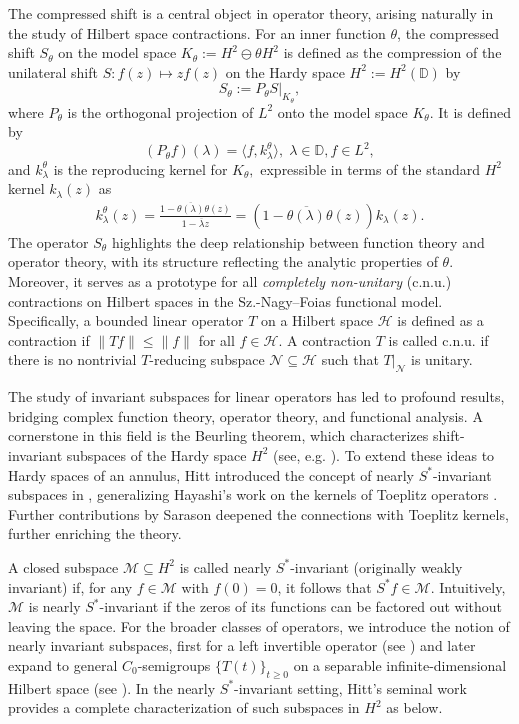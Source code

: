 \documentclass[12pt,reqno]{amsart}
\theoremstyle{definition}
\theoremstyle{remark}
\numberwithin{equation}{section}
\newcommand{\ol}{\overline}
\newcommand{\ma}{\mathcal}
\begin{document}
The compressed shift  is a central object in operator theory, arising naturally in the study of Hilbert space contractions. For an inner function $\theta$, the compressed shift $S_\theta$ on the model space $K_\theta := H^2 \ominus \theta H^2$ is defined as the compression of the unilateral shift $S \colon f(z) \mapsto zf(z)$ on the Hardy space $H^2:=H^2(\mathbb{D})$ by $$
S_\theta := P_\theta S|_{K_\theta},$$
where $P_\theta$ is the orthogonal projection of $L^2$ onto the model space $K_\theta.$ It is defined by $$(P_\theta f)(\lambda)=\langle f,k_\lambda^\theta\rangle,\;\lambda \in \mathbb{D}, f\in L^2,$$ and $k_\lambda^\theta$ is the reproducing kernel for $K_\theta,$ expressible in terms of the standard $H^2$ kernel  $k_\lambda(z)$  as \begin{align*}k_\lambda^{\theta}(z)=
 \frac{1-\ol{\theta(\lambda)}\theta(z)}
 {1-\ol{\lambda}z}=(1-\ol{\theta(\lambda)}\theta(z))
 k_\lambda(z).\end{align*}  The operator  $S_\theta$ highlights the deep relationship between function theory and operator theory, with its structure reflecting the analytic properties of $\theta$. Moreover, it  serves as a prototype for all \emph{completely non-unitary} (c.n.u.)  contractions  on Hilbert spaces in the Sz.-Nagy--Foias functional model. Specifically, a bounded linear operator $T$ on a Hilbert space $\ma{H}$ is defined as a contraction if $\|Tf\|\leq \|f\|$ for all $f\in \ma{H}.$ A contraction $T$ is called  c.n.u.  if there is no nontrivial $T$-reducing subspace $\ma{N}\subseteq \ma{H}$  such that $T|_{\ma{N}}$ is unitary.

 The study of invariant subspaces for linear operators has led to  profound results, bridging  complex function theory, operator theory, and functional analysis. A cornerstone in this field is the Beurling theorem, which characterizes   shift-invariant subspaces of the Hardy space \( H^2\) (see, e.g.  \cite[A.~Corollary 1.4.1]{Nik}).
 To extend these ideas to Hardy spaces of an annulus, Hitt introduced the concept of nearly $S^*$-invariant subspaces in \cite{hitt},   generalizing Hayashi's work on the kernels
 of Toeplitz operators \cite{Ha}. Further contributions by Sarason \cite{Sa1, Sa2} deepened the connections with Toeplitz   kernels, further enriching the theory.

 A closed subspace \(\mathcal{M} \subseteq H^2 \) is called nearly \(S^*\)-invariant  (originally weakly invariant) if, for any \(f \in \mathcal{M}\) with \(f(0) = 0\), it follows that \(S^* f \in \mathcal{M}\). Intuitively, \(\mathcal{M} \) is nearly \(S^*\)-invariant if the zeros of its functions  can be factored out without leaving the space. For the broader classes of operators, we introduce the notion of nearly invariant subspaces, first for a left invertible operator (see \cite{LP2}) and later expand to general $C_0$-semigroups $\{T(t)\}_{t\geq 0}$ on a separable infinite-dimensional Hilbert space (see \cite{LP3}).  In the nearly $S^*$-invariant setting, Hitt's seminal work provides a complete characterization of such subspaces in \(H^2 \) as below.
\end{document}

